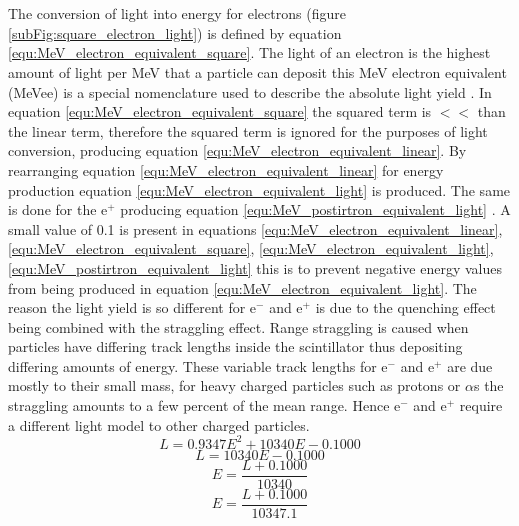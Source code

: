 \\\\The conversion of light into energy for electrons (figure \ref{subFig:square_electron_light}) is defined by equation \ref{equ:MeV_electron_equivalent_square}. The light of an electron is the highest amount of light per MeV that a particle can deposit this MeV electron equivalent (MeVee) is a special nomenclature used to describe the absolute light yield \cite{knoll_2010}. In equation \ref{equ:MeV_electron_equivalent_square} the squared term is $ << $ than the linear term, therefore the squared term is ignored for the purposes of light conversion, producing equation \ref{equ:MeV_electron_equivalent_linear}. By rearranging equation \ref{equ:MeV_electron_equivalent_linear} for energy production equation \ref{equ:MeV_electron_equivalent_light} is produced. The same is done for the e$^+$ producing equation \ref{equ:MeV_postirtron_equivalent_light} . A small value of 0.1 is present in equations \ref{equ:MeV_electron_equivalent_linear}, \ref{equ:MeV_electron_equivalent_square}, \ref{equ:MeV_electron_equivalent_light}, \ref{equ:MeV_postirtron_equivalent_light} this is to prevent negative energy values from being produced in equation \ref{equ:MeV_electron_equivalent_light}.  The reason the light yield is so different for e$^-$ and e$^+$ is due to the quenching effect being combined with the straggling effect. Range straggling is caused when particles have differing track lengths inside the scintillator thus depositing differing amounts of energy. These variable track lengths for e$^-$ and e$^+$ are due mostly to their small mass, for heavy charged particles such as protons or $\alpha$s the straggling amounts to a few percent of the mean range\cite{knoll_2010}. Hence e$^-$ and e$^+$ require a different light model to other charged particles.
\begin{equation}
L = 0.9347E^2 + 10340E - 0.1000
\label{equ:MeV_electron_equivalent_square}
\end{equation}
\begin{equation}
L = 10340E - 0.1000
\label{equ:MeV_electron_equivalent_linear}
\end{equation}
\begin{equation}
E = \frac{L +0.1000}{10340} 
\label{equ:MeV_electron_equivalent_light}
\end{equation}
\begin{equation}
E = \frac{L +0.1000}{10347.1}
\label{equ:MeV_postirtron_equivalent_light}
\end{equation}

